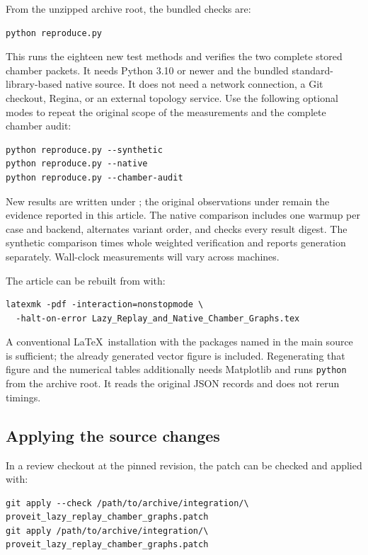From the unzipped archive root, the bundled checks are:

\begin{lstlisting}
python reproduce.py
\end{lstlisting}

This runs the eighteen new test methods and verifies the two complete
stored chamber packets. It needs Python 3.10 or newer and the bundled
standard-library-based native source. It does not need a network
connection, a Git checkout, Regina, or an external topology service.
Use the following optional modes to repeat the original scope of the
measurements and the complete chamber audit:

\begin{lstlisting}
python reproduce.py --synthetic
python reproduce.py --native
python reproduce.py --chamber-audit
\end{lstlisting}

New results are written under ; the original observations
under  remain the evidence reported in this article.
The native comparison includes one warmup per case and backend,
alternates variant order, and checks every result digest. The synthetic
comparison times whole weighted verification and reports generation
separately. Wall-clock measurements will vary across machines.

The article can be rebuilt from  with:

\begin{lstlisting}
latexmk -pdf -interaction=nonstopmode \
  -halt-on-error Lazy_Replay_and_Native_Chamber_Graphs.tex
\end{lstlisting}

A conventional \LaTeX\ installation with the packages named in the main
source is sufficient; the already generated vector figure is included.
Regenerating that figure and the numerical tables additionally needs
Matplotlib and runs \texttt{python} \code{scripts/make_figures.py} from the archive
root. It reads the original JSON records and does not rerun timings.

\subsection{Applying the source changes}

In a review checkout at the pinned revision, the patch can be checked
and applied with:

\begin{lstlisting}
git apply --check /path/to/archive/integration/\
proveit_lazy_replay_chamber_graphs.patch
git apply /path/to/archive/integration/\
proveit_lazy_replay_chamber_graphs.patch
\end{lstlisting}

